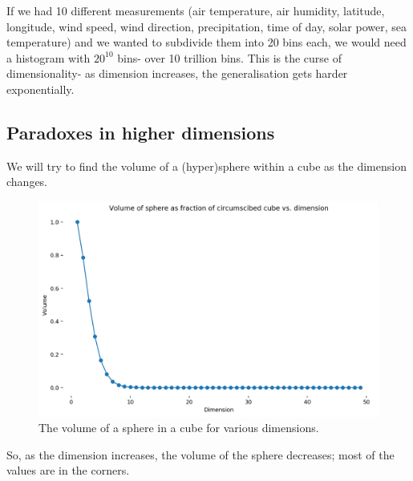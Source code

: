 \documentclass[a4paper, openany]{memoir}
\begin{document}
    If we had 10 different measurements (air temperature, air humidity, latitude, longitude, wind speed, wind direction, precipitation, time of day, solar power, sea temperature) and we wanted to subdivide them into 20 bins each, we would need a histogram with $20^{10}$ bins- over 10 trillion bins. This is the curse of dimensionality- as dimension increases, the generalisation gets harder exponentially.

    \subsection{Paradoxes in higher dimensions}
    We will try to find the volume of a (hyper)sphere within a cube as the dimension changes.
    \begin{figure}[H]
        \centering
        \includegraphics[scale=0.45]{src/3.6 VolumeVDimension.png}
        \caption{The volume of a sphere in a cube for various dimensions.}
    \end{figure}
    \noindent So, as the dimension increases, the volume of the sphere decreases; most of the values are in the corners.
\end{document}
